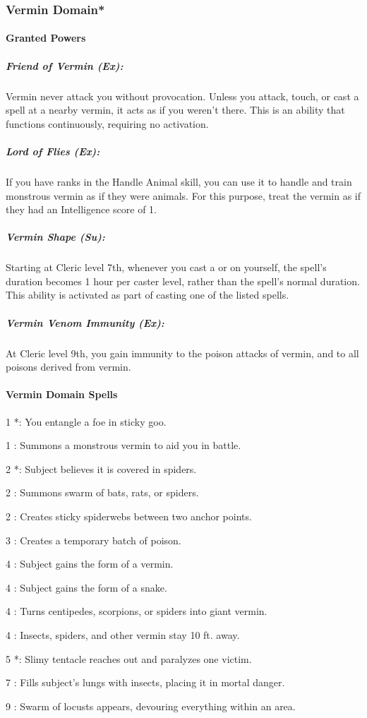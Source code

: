 \subsubsection[Vermin Domain]{Vermin Domain*}
\paragraph{Granted Powers}
\subparagraph{Friend of Vermin (Ex):}
Vermin never attack you without provocation. Unless you attack, touch, or cast a spell at a nearby vermin, it acts as if you weren't there.
This is an ability that functions continuously, requiring no activation.
\subparagraph{Lord of Flies (Ex):}
If you have ranks in the Handle Animal skill, you can use it to handle and train monstrous vermin as if they were animals.
For this purpose, treat the vermin as if they had an Intelligence score of 1.
\subparagraph{Vermin Shape (Su):}
Starting at Cleric level 7th, whenever you cast a  or  on yourself, 
the spell's duration becomes 1 hour per caster level, rather than the spell's normal duration.
This ability is activated as part of casting one of the listed spells.
\subparagraph{Vermin Venom Immunity (Ex):}
At Cleric level 9th, you gain immunity to the poison attacks of vermin, and to all poisons derived from vermin.
\paragraph{Vermin Domain Spells}
\begin{list}{}{\leftmargin=1em}
\item[1] *: You entangle a foe in sticky goo.
\item[1] : Summons a monstrous vermin to aid you in battle.
\item[2] *: Subject believes it is covered in spiders.
\item[2] : Summons swarm of bats, rats, or spiders.
\item[2] : Creates sticky spiderwebs between two anchor points.
\item[3] : Creates a temporary batch of poison.
\item[4] : Subject gains the form of a vermin.
\item[4] : Subject gains the form of a snake.
\item[4] : Turns centipedes, scorpions, or spiders into giant vermin.
\item[4] : Insects, spiders, and other vermin stay 10 ft. away.
\item[5] *: Slimy tentacle reaches out and paralyzes one victim.
\item[7] : Fills subject's lungs with insects, placing it in mortal danger.
\item[9] : Swarm of locusts appears, devouring everything within an area.
\end{list}
